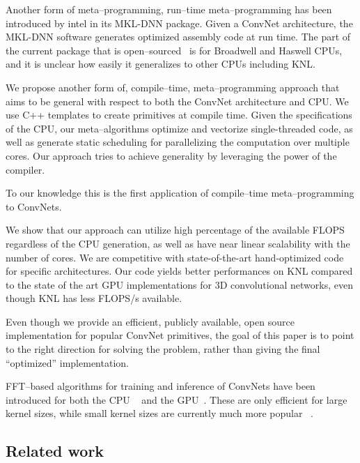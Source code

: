   Another form of meta--programming, run--time meta--programming has
  been introduced by intel in its MKL-DNN package.  Given a ConvNet
  architecture, the MKL-DNN software generates optimized assembly code
  at run time.  The part of the current package that is
  open--sourced~\cite{idlf,mkl-dnn} is for Broadwell and Haswell CPUs,
  and it is unclear how easily it generalizes to other CPUs including
  KNL.

  We propose another form of, compile--time, meta--programming
  approach that aims to be general with respect to both the ConvNet
  architecture and CPU.  We use C++ templates to create primitives at
  compile time.  Given the specifications of the CPU, our
  meta--algorithms optimize and vectorize single-threaded code, as
  well as generate static scheduling for parallelizing the computation
  over multiple cores.  Our approach tries to achieve generality by
  leveraging the power of the compiler.

  To our knowledge this is the first application of compile--time
  meta--programming to ConvNets.

  We show that our approach can utilize high percentage of the
  available FLOPS regardless of the CPU generation, as well as have
  near linear scalability with the number of cores.  We are
  competitive with state-of-the-art hand-optimized code for specific
  architectures.  Our code yields better performances on KNL
  compared to the state of the art GPU implementations for 3D
  convolutional networks, even though KNL has less FLOPS/s available.

  Even though we provide an efficient, publicly available, open source
  implementation for popular ConvNet primitives, the goal of this
  paper is to point to the right direction for solving the problem,
  rather than giving the final ``optimized'' implementation.

  FFT--based algorithms for training and inference of ConvNets have
  been introduced for both the CPU
  ~\cite{zlateski2016znn,zlateski2016znni} and the
  GPU~\cite{mathieu-iclr-14,vasilache2014fast}.  These are only
  efficient for large kernel sizes, while small kernel sizes are
  currently much more popular
  ~\cite{szegedy2015going,ronneberger2015u, simonyan2014very,
    sermanet2013overfeat, long2015fully, tran2015learning, ji20133d,
    maturana_iros_2015, maturana_icra_2014}.

  \subsection{Related work}

